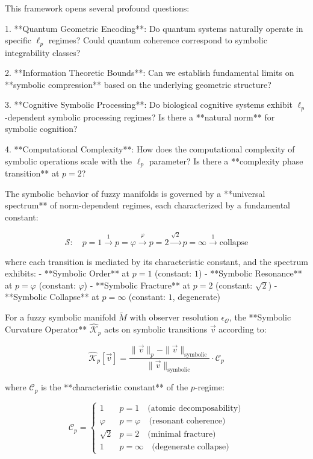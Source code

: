 \begin{remark}
\label{remark:bk5_open_questions}
This framework opens several profound questions:

1. **Quantum Geometric Encoding**: Do quantum systems naturally operate in specific $\ell_p$ regimes? Could quantum coherence correspond to symbolic integrability classes?

2. **Information Theoretic Bounds**: Can we establish fundamental limits on **symbolic compression** based on the underlying geometric structure?

3. **Cognitive Symbolic Processing**: Do biological cognitive systems exhibit $\ell_p$-dependent symbolic processing regimes? Is there a **natural norm** for symbolic cognition?

4. **Computational Complexity**: How does the computational complexity of symbolic operations scale with the $\ell_p$ parameter? Is there a **complexity phase transition** at $p = 2$?
\end{remark}

\begin{theorem}
\label{thm:bk5_symbolic_norm_spectrum}
The symbolic behavior of fuzzy manifolds is governed by a **universal spectrum** of norm-dependent regimes, each characterized by a fundamental constant:

$$\mathcal{S}: \quad p = 1 \xrightarrow{1} p = \varphi \xrightarrow{\varphi} p = 2 \xrightarrow{\sqrt{2}} p = \infty \xrightarrow{1} \text{collapse}$$

where each transition is mediated by its characteristic constant, and the spectrum exhibits:
- **Symbolic Order** at $p = 1$ (constant: $1$)
- **Symbolic Resonance** at $p = \varphi$ (constant: $\varphi$) 
- **Symbolic Fracture** at $p = 2$ (constant: $\sqrt{2}$)
- **Symbolic Collapse** at $p = \infty$ (constant: $1$, degenerate)
\end{theorem}

\begin{definition}
\label{def:bk5_symbolic_curvature_operator_spectrum}
For a fuzzy symbolic manifold $\tilde{M}$ with observer resolution $\epsilon_\mathcal{O}$, the **Symbolic Curvature Operator** $\hat{\mathcal{K}}_p$ acts on symbolic transitions $\vec{v}$ according to:

$$\hat{\mathcal{K}}_p[\vec{v}] = \frac{\|\vec{v}\|_p - \|\vec{v}\|_{\text{symbolic}}}{\|\vec{v}\|_{\text{symbolic}}} \cdot \mathcal{C}_p$$

where $\mathcal{C}_p$ is the **characteristic constant** of the $p$-regime:

$$\mathcal{C}_p = \begin{cases}
1 & p = 1 \quad \text{(atomic decomposability)} \\
\varphi & p = \varphi \quad \text{(resonant coherence)} \\
\sqrt{2} & p = 2 \quad \text{(minimal fracture)} \\
1 & p = \infty \quad \text{(degenerate collapse)}
\end{cases}$$
\end{definition}

